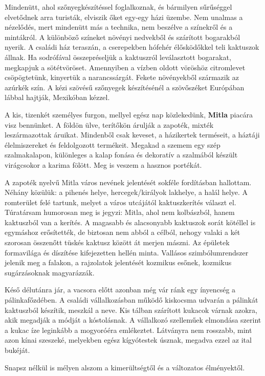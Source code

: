 Mindenütt, ahol szőnyegkészítéssel foglalkoznak, és bármilyen
sűrűséggel elvetődnek arra turisták, elviszik őket egy-egy házi üzembe.
Nem unalmas a nézelődés, mert mindenütt más a technika, nem
beszélve a színekről és a mintákról. A különböző színeket növényi
nedvekből és szárított bogarakból nyerik. A családi ház teraszán,
a cserepekben hófehér élősködőkkel teli kaktuszok állnak. Ha sodrófával
összepréseljük a kaktuszról leválasztott bogarakat, megkapjuk a
sötétvöröset. Amennyiben a vízben oldott vöröshöz citromlevet csöpögtetünk,
kinyertük a narancssárgát. Fekete növényekből származik
az azúrkék szín. A kézi szövésű szőnyegek készítésénél a szövőszéket
Európában lábbal hajtják, Mexikóban kézzel.

A kis, tizenkét személyes furgon, mellyel egész nap közlekedünk,
\textbf{Mitla} piacára visz bennünket. A földön ülve, terítőkön árulják
a zapoték, mixték leszármazottak áruikat. Mindenből csak keveset, a
házikertek terméseit, a háztáji élelmiszereket és feldolgozott termékeit.
Megakad a szemem egy szép szalmakalapon, különleges a kalap fonása
és dekoratív a szalmából készült virágcsokor a karima fölött. Meg is
veszem a hasznos portékát.

A zapoték nyelvű Mitla város nevének jelentését sokféle fordításban
hallottam. Néhány közülük: a pihenés helye, hercegek/királyok lakhelye,
a halál helye. A romterület felé tartunk, melyet a város utcájától
kaktuszkerítés választ el. Túratársam humorosan meg is jegyzi: Mitla, ahol
nem kolbászból, hanem kaktuszból van a kerítés. A magasabb és alacsonyabb
kaktuszok sorát kötéllel is egymáshoz erősítették, de biztosan nem abból
a célból, nehogy valaki a két szorosan összenőtt tüskés kaktusz között át
merjen mászni. Az épületek formavilága és díszítése kifejezetten hellén
minta. Vallásos szimbólumrendszer jelenik meg a falakon, a rajzolatok
jelentését kozmikus esőnek, kozmikus sugárzásoknak magyarázzák.

Késő délutánra jár, a vacsora előtt azonban még vár ránk egy ínyencség
a pálinkafőzdében. A családi vállalkozásban működő kiskocsma
udvarán a pálinkát kaktuszból készítik, meszkál a neve. Kis tálban
szárított kukacok várnak azokra, akik megadják a módját a kóstolásnak.
A vállalkozó szelleműek elmondása szerint a kukac íze leginkább a
mogyoróéra emlékeztet. Látványra nem rosszabb, mint azon kínai
szeszeké, melyekben egész kígyótestek úsznak, megadva ezzel az ital bukéját.

Snapsz nélkül is mélyen alszom a kimerültségtől és a változatos
élményektől.

